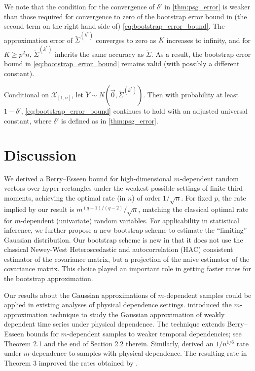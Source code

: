 \documentclass[aos]{imsart}
\begin{document}
We note that the condition for the convergence of $\delta'$ in \cref{thm:psg_error} is weaker than those required for convergence to zero of the bootstrap error bound in (the second term on the right hand side of) \cref{eq:bootstrap_error_bound}. The approximation error of $\tilde{\Sigma}^{(k^*)}$ converges to zero as $K$ increases to infinity, and for $K \geq p^2 n$, $\tilde\Sigma^{(k^*)}$
inherits the same accuracy as $\tilde\Sigma$. As a result, the bootstrap error bound in
\cref{eq:bootstrap_error_bound} remains valid (with possibly a different constant).

\begin{corollary}
    Conditional on $\mathscr{X}_{[1,n]}$, let $\tilde{Y} \sim N(\vec 0, \tilde\Sigma^{(k^{*})})$. Then with probability at least $1 - \delta'$, \cref{eq:bootstrap_error_bound} continues to hold with an adjusted universal constant, where $\delta'$ is defined as in \cref{thm:psg_error}.
\end{corollary}

\section{Discussion} \label{sec:discussion}

We derived a Berry--Esseen bound for high-dimensional $m$-dependent random vectors over hyper-rectangles under the weakest possible settings of finite third moments, achieving the optimal rate (in $n$) of order $1/\sqrt{n}$. For fixed $p$, the rate implied by our result is $m^{(q-1)/(q-2)} / \sqrt{n}$, matching the classical optimal rate for $m$-dependent (univariate) random variables. %
For applicability in statistical inference, we further propose a new bootstrap scheme to estimate the ``limiting'' Gaussian distribution. Our bootstrap scheme is new in that it does not use the classical Newey-West Heteroscedastic and autocorrelation (HAC) consistent estimator of the covariance matrix, but a projection of the naive estimator of the covariance matrix. This choice played an important role in getting faster rates for the bootstrap approximation.

Our results about the Gaussian approximations of $m$-dependent samples could be applied in existing analyses of physical dependence settings. \citet{zhang2018gaussian} introduced the $m$-approximation technique to study the Gaussian approximation of weakly dependent time series under physical dependence. The technique extends Berry--Esseen bounds for $m$-dependent samples to weaker temporal dependencies; see Theorem 2.1 and the end of Section 2.2 therein. Similarly, \citet{chang2021central} derived an $1/n^{1/6}$ rate under $m$-dependence to samples with physical dependence. The resulting rate in Theorem 3 improved the rates obtained by \citet{zhang2017gaussian}.
\end{document}
